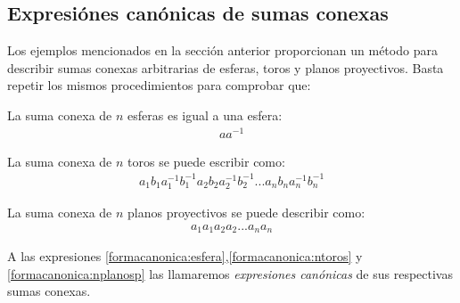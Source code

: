 \documentclass[a4paper,11pt,spanish, twoside, leqno]{tfg-uam}
\theoremstyle{definition}
\begin{document}
\subsection{Expresiónes canónicas de sumas conexas}
\label{subsec:expresionescanonicassumasconexas}
Los ejemplos mencionados en la sección anterior proporcionan un método para describir sumas conexas arbitrarias de esferas, toros y planos proyectivos. Basta repetir los mismos procedimientos para comprobar que:

\begin{list}{-}{}
	\item La suma conexa de $ n $ esferas es igual a una esfera:
	\begin{align}\label{formacanonica:esfera}
		aa^{-1} 
	\end{align}
	\item La suma conexa de $ n $ toros se puede escribir como:
	\begin{align}\label{formacanonica:ntoros}
		a_1b_1a_1^{-1}b_1^{-1}a_2b_2a_2^{-1}b_2^{-1}...a_nb_na_n^{-1}b_n^{-1}
	\end{align}
	\item La suma conexa de $ n $ planos proyectivos se puede describir como: 
	\begin{align}\label{formacanonica:nplanosp}
	a_1a_1a_2a_2...a_na_n
	\end{align}
\end{list}
A las expresiones \ref{formacanonica:esfera},\ref{formacanonica:ntoros} y \ref{formacanonica:nplanosp} las llamaremos \textit{expresiones canónicas} de sus respectivas sumas conexas.
\end{document}
